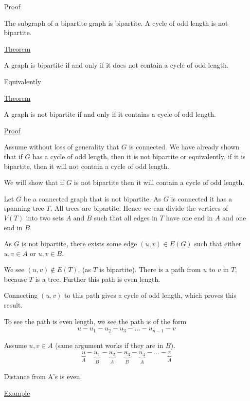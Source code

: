 \documentclass{article}
\begin{document}
\underline{Proof}

The subgraph of a bipartite graph is bipartite. A cycle of odd length is not bipartite. 



\underline{Theorem}

A graph is bipartite if and only if it does not contain a cycle of odd length. 

Equivalently

\underline{Theorem}

A graph is not bipartite if and only if it contains a cycle of odd length. 

\underline{Proof}

Assume without loss of generality that $G$ is connected. We have already shown that if $G$ has a cycle of odd length, then it is not bipartite or equivalently, if it is bipartite, then it will not contain a cycle of odd length. 

We will show that if $G$ is not bipartite then it will contain a cycle of odd length. 

Let $G$ be a connected graph that is not bipartite. As $G$ is connected it has a spanning tree $T$. All trees are bipartite. Hence we can divide the vertices of $V(T)$ into two sets $A$ and $B$ such that all edges in $T$ have one end in $A$ and one end in $B$. 

As $G$ is not bipartite, there exists some edge $(u,v) \in E(G)$ such that either $u,v \in A$ or $u,v \in B$. 

We see $(u,v) \not\in E(T)$, (as $T$ is bipartite). There is a path from $u$ to $v$ in $T$, because $T$ is a tree. Further this path is even length. 

Connecting $(u,v)$ to this path gives a cycle of odd length, which proves this result. 

To see the path is even length, we see the path is of the form
\begin{align*}
u - u_1 - u_2 - u_3 - \ldots - u_{n-1} - v
\end{align*}

Assume $u,v \in A$ (same argument works if they are in $B$). 
\begin{align*}
\underbrace{u}_{A} - \underbrace{u_1}_{B} - \underbrace{u_2}_{A} - \underbrace{u_3}_{B} - \underbrace{u_4}_{A} - \ldots - \underbrace{v}_{A}
\end{align*}

Distance from A's is even. 

\underline{Example}
\end{document}
